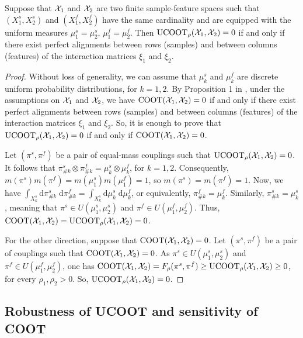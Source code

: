 \begin{claim}
  Suppose that $\mathcal X_1$ and $\mathcal X_2$ are two finite sample-feature spaces such that
  $(X^s_1, X^s_2)$ and $(X^f_1, X^f_2)$
  have the same cardinality and are equipped with the uniform measures
  $\mu_1^s = \mu_2^s$, $\mu_1^f = \mu_2^f$. Then $\text{UCOOT}_{\rho}(\mathcal X_1, \mathcal X_2) = 0$
  if and only if there exist perfect alignments between rows (samples) and between
  columns (features) of the interaction matrices $\xi_1$ and $\xi_2$.
\end{claim}
\begin{proof}
  Without loss of generality, we can assume that $\mu_k^s$ and $\mu_k^f$ are
  discrete uniform probability distributions, for $k=1,2$. By Proposition 1 in \citep{Redko20},
  under the assumptions on $\mathcal X_1$ and $\mathcal X_2$, we have
  $\text{COOT}(\mathcal X_1, \mathcal X_2) = 0$ if and only if there exist perfect alignments
  between rows (samples) and between columns (features) of the interaction matrices $\xi_1$ and
  $\xi_2$. So, it is enough to prove that $\text{UCOOT}_{\rho}(\mathcal X_1, \mathcal X_2) = 0$
  if and only if $\text{COOT}(\mathcal X_1, \mathcal X_2) = 0$.

  Let $(\pi^s, \pi^f)$ be a pair of equal-mass couplings such that
  $\text{UCOOT}_{\rho}(\mathcal X_1, \mathcal X_2) = 0$. It follows that
  $\pi^s_{\#k} \otimes \pi^f_{\#k} = \mu_k^s \otimes \mu_k^f$, for $k=1,2$. Consequently,
  $m(\pi^s) m(\pi^f) = m(\mu_1^s) m(\mu_1^f) = 1$, so $m(\pi^s) = m(\pi^f) = 1$. Now, we have
  $\int_{X_k^s} \mathrm d \pi^s_{\#k} \; \mathrm d \pi^f_{\#k}
  = \int_{X_k^s} \mathrm d\mu_k^s \; \mathrm d\mu_k^f$, or equivalently,
  $\pi^f_{\#k} = \mu_k^f$. Similarly, $\pi^s_{\#k} = \mu_k^s$, meaning that
  $\pi^s \in U(\mu_1^s, \mu_2^s)$ and $\pi^f \in U(\mu_1^f, \mu_2^f)$. Thus,
  $\text{COOT}(\mathcal X_1, \mathcal X_2) = \text{UCOOT}_{\rho}(\mathcal X_1, \mathcal X_2) = 0$.

  For the other direction, suppose that $\text{COOT}(\mathcal X_1, \mathcal X_2) = 0$.
  Let $(\pi^s, \pi^f)$ be a pair of couplings such that $\text{COOT}(\mathcal X_1, \mathcal X_2) = 0$.
  As $\pi^s \in U(\mu_1^s, \mu_2^s)$ and $\pi^f \in U(\mu_1^f, \mu_2^f)$, one has
  $\text{COOT}(\mathcal X_1, \mathcal X_2) = F_{\rho}(\pi^s, \pi^f) \geq
  \text{UCOOT}_{\rho}(\mathcal X_1, \mathcal X_2) \geq 0$,
  for every $\rho_1, \rho_2 > 0$. So, $\text{UCOOT}_{\rho}(\mathcal X_1, \mathcal X_2) = 0$.
\end{proof}

\subsection{Robustness of UCOOT and sensitivity of COOT}


